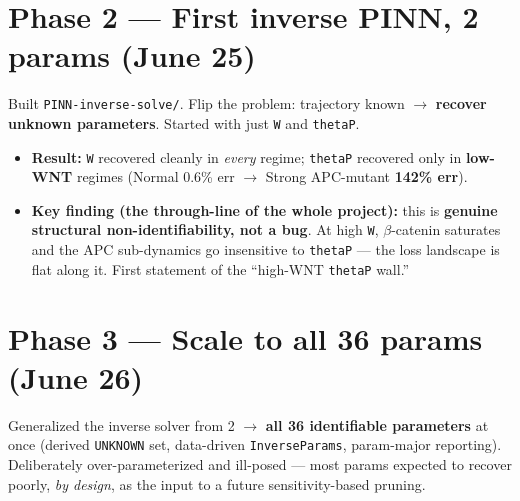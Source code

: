 \documentclass[11pt]{article}
\newcommand{\code}[1]{\texttt{\textcolor{codegray}{#1}}}
\begin{document}
\section*{Phase 2 --- First inverse PINN, 2 params (June 25)}
Built \code{PINN-inverse-solve/}. Flip the problem: trajectory known $\rightarrow$ \textbf{recover unknown parameters}. Started with just \code{W} and \code{thetaP}.
\begin{itemize}
\item \textbf{Result:} \code{W} recovered cleanly in \textit{every} regime; \code{thetaP} recovered only in \textbf{low-WNT} regimes (Normal 0.6\% err $\rightarrow$ Strong APC-mutant \textbf{142\% err}).
\item \textbf{Key finding (the through-line of the whole project):} this is \textbf{genuine structural non-identifiability, not a bug}. At high \code{W}, $\beta$-catenin saturates and the APC sub-dynamics go insensitive to \code{thetaP} --- the loss landscape is flat along it. First statement of the ``high-WNT \code{thetaP} wall.''
\end{itemize}

\section*{Phase 3 --- Scale to all 36 params (June 26)}
Generalized the inverse solver from 2 $\rightarrow$ \textbf{all 36 identifiable parameters} at once (derived \code{UNKNOWN} set, data-driven \code{InverseParams}, param-major reporting). Deliberately over-parameterized and ill-posed --- most params expected to recover poorly, \textit{by design}, as the input to a future sensitivity-based pruning.
\end{document}
